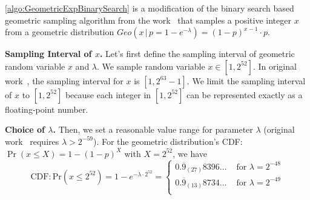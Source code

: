 \autoref{algo:GeometricExpBinarySearch} is a modification of the binary search based geometric sampling algorithm from the work~\cite{googleDP2019GitHub} that samples a positive integer $x$ from a geometric distribution $Geo\left(x\,|\,p=1-e^{-\lambda}\right)=\left(1-p\right)^{x-1}\cdot p $.

\textbf{Sampling Interval of $x$.}
Let's first define the sampling interval of geometric random variable $x$ and $\lambda$.
We sample random variable $x \in \left[1, 2^{52}\right] $.
In original work~\cite{googleDP2019GitHub}, the sampling interval for $x$ is $ \left[1, 2^{63}-1\right]$. We limit the sampling interval of $x$ to $\left[1, 2^{52}\right]$ because each integer in  $\left[1, 2^{52}\right]$ can be represented exactly as a floating-point number.





\textbf{Choice of $\lambda$. }
Then, we set a reasonable value range for parameter $\lambda$ (original work~\cite{googleDP2019} requires $\lambda > 2^{-59}$).
For the geometric distribution's CDF: $\Pr\left(x\leq X \right) =1-\left(1-p\right)^X $ with $X=2^{52}$, we have
\begin{equation}
    \text{CDF}: \text{Pr}\left(x \leq 2^{52}\right)=
    1-e^{-\lambda\cdot 2^{52} }=
    \begin{cases}
        0.\overline{9}_{\left(27\right) }8396\ldots & \text{ for }\lambda=2^{-48} \\
        0.\overline{9}_{\left(13\right) }8734\ldots & \text{ for }\lambda=2^{-49} \\
    \end{cases}
\end{equation}

